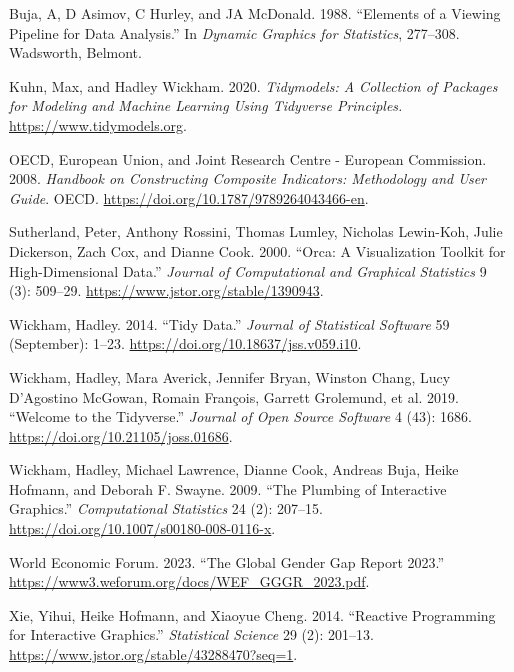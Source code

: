 \documentclass[
]{interact}
\newlength{\cslhangindent}
\newlength{\cslentryspacingunit} %
\newenvironment{CSLReferences}[2] %
 {%
  \setlength{\parindent}{0pt}
  \ifodd #1
  \let\oldpar\par
  \def\par{\hangindent=\cslhangindent\oldpar}
  \fi
  \setlength{\parskip}{#2\cslentryspacingunit}
 }%
 {}
\begin{document}
\hypertarget{refs}{}
\begin{CSLReferences}{1}{0}
\leavevmode{}%
Buja, A, D Asimov, C Hurley, and JA McDonald. 1988. {``Elements of a
Viewing Pipeline for Data Analysis.''} In \emph{Dynamic Graphics for
Statistics}, 277--308. Wadsworth, Belmont.

\leavevmode{}%
Kuhn, Max, and Hadley Wickham. 2020. \emph{Tidymodels: A Collection of
Packages for Modeling and Machine Learning Using Tidyverse Principles.}
\url{https://www.tidymodels.org}.

\leavevmode{}%
OECD, European Union, and Joint Research Centre - European Commission.
2008. \emph{Handbook on {Constructing} {Composite} {Indicators}:
{Methodology} and {User} {Guide}}. OECD.
\url{https://doi.org/10.1787/9789264043466-en}.

\leavevmode{}%
Sutherland, Peter, Anthony Rossini, Thomas Lumley, Nicholas Lewin-Koh,
Julie Dickerson, Zach Cox, and Dianne Cook. 2000. {``Orca: {A}
{Visualization} {Toolkit} for {High}-{Dimensional} {Data}.''}
\emph{Journal of Computational and Graphical Statistics} 9 (3): 509--29.
\url{https://www.jstor.org/stable/1390943}.

\leavevmode{}%
Wickham, Hadley. 2014. {``Tidy {Data}.''} \emph{Journal of Statistical
Software} 59 (September): 1--23.
\url{https://doi.org/10.18637/jss.v059.i10}.

\leavevmode{}%
Wickham, Hadley, Mara Averick, Jennifer Bryan, Winston Chang, Lucy
D'Agostino McGowan, Romain François, Garrett Grolemund, et al. 2019.
{``Welcome to the {Tidyverse}.''} \emph{Journal of Open Source Software}
4 (43): 1686. \url{https://doi.org/10.21105/joss.01686}.

\leavevmode{}%
Wickham, Hadley, Michael Lawrence, Dianne Cook, Andreas Buja, Heike
Hofmann, and Deborah F. Swayne. 2009. {``The Plumbing of Interactive
Graphics.''} \emph{Computational Statistics} 24 (2): 207--15.
\url{https://doi.org/10.1007/s00180-008-0116-x}.

\leavevmode{}%
World Economic Forum. 2023. {``{The Global Gender Gap Report 2023}.''}
\url{https://www3.weforum.org/docs/WEF_GGGR_2023.pdf}.

\leavevmode{}%
Xie, Yihui, Heike Hofmann, and Xiaoyue Cheng. 2014. {``Reactive
{Programming} for {Interactive} {Graphics}.''} \emph{Statistical
Science} 29 (2): 201--13.
\url{https://www.jstor.org/stable/43288470?seq=1}.

\end{CSLReferences}
\end{document}
